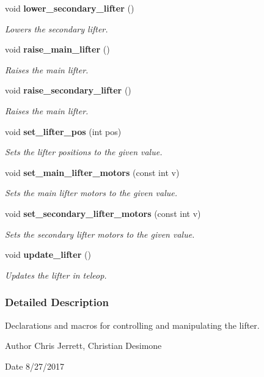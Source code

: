 \begin{DoxyCompactItemize}
void \textbf{ lower\+\_\+secondary\+\_\+lifter} ()
\begin{DoxyCompactList}\small\item\em Lowers the secondary lifter. \end{DoxyCompactList}\item 
void \textbf{ raise\+\_\+main\+\_\+lifter} ()
\begin{DoxyCompactList}\small\item\em Raises the main lifter. \end{DoxyCompactList}\item 
void \textbf{ raise\+\_\+secondary\+\_\+lifter} ()
\begin{DoxyCompactList}\small\item\em Raises the main lifter. \end{DoxyCompactList}\item 
void \textbf{ set\+\_\+lifter\+\_\+pos} (int pos)
\begin{DoxyCompactList}\small\item\em Sets the lifter positions to the given value. \end{DoxyCompactList}\item 
void \textbf{ set\+\_\+main\+\_\+lifter\+\_\+motors} (const int v)
\begin{DoxyCompactList}\small\item\em Sets the main lifter motors to the given value. \end{DoxyCompactList}\item 
void \textbf{ set\+\_\+secondary\+\_\+lifter\+\_\+motors} (const int v)
\begin{DoxyCompactList}\small\item\em Sets the secondary lifter motors to the given value. \end{DoxyCompactList}\item 
void \textbf{ update\+\_\+lifter} ()
\begin{DoxyCompactList}\small\item\em Updates the lifter in teleop. \end{DoxyCompactList}\end{DoxyCompactItemize}


\subsubsection{Detailed Description}
Declarations and macros for controlling and manipulating the lifter. 

\begin{DoxyAuthor}{Author}
Chris Jerrett, Christian Desimone 
\end{DoxyAuthor}
\begin{DoxyDate}{Date}
8/27/2017 
\end{DoxyDate}


